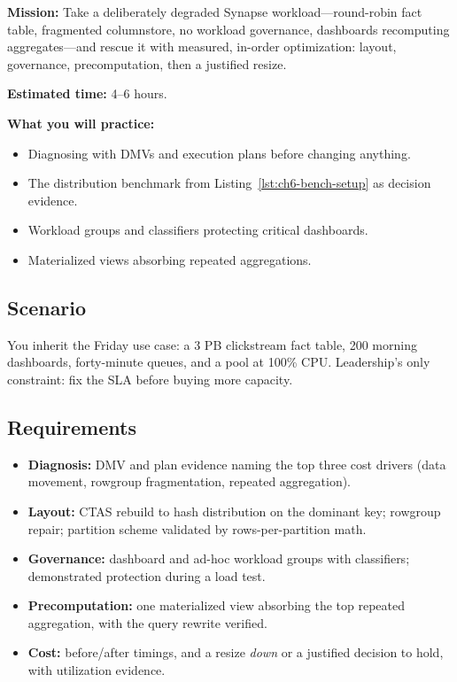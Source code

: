 \begin{capstonebox}
\textbf{Mission:} Take a deliberately degraded Synapse workload---round-robin fact table, fragmented columnstore, no workload governance, dashboards recomputing aggregates---and rescue it with measured, in-order optimization: layout, governance, precomputation, then a justified resize.

\textbf{Estimated time:} 4--6 hours.

\textbf{What you will practice:}
\begin{itemize}
    \item Diagnosing with DMVs and execution plans before changing anything.
    \item The distribution benchmark from Listing~\ref{lst:ch6-bench-setup} as decision evidence.
    \item Workload groups and classifiers protecting critical dashboards.
    \item Materialized views absorbing repeated aggregations.
\end{itemize}
\end{capstonebox}

\subsection*{Scenario}
You inherit the Friday use case: a 3 PB clickstream fact table, 200 morning dashboards, forty-minute queues, and a pool at 100\% CPU. Leadership's only constraint: fix the SLA before buying more capacity.

\subsection*{Requirements}
\begin{itemize}
    \item \textbf{Diagnosis:} DMV and plan evidence naming the top three cost drivers (data movement, rowgroup fragmentation, repeated aggregation).
    \item \textbf{Layout:} CTAS rebuild to hash distribution on the dominant key; rowgroup repair; partition scheme validated by rows-per-partition math.
    \item \textbf{Governance:} dashboard and ad-hoc workload groups with classifiers; demonstrated protection during a load test.
    \item \textbf{Precomputation:} one materialized view absorbing the top repeated aggregation, with the query rewrite verified.
    \item \textbf{Cost:} before/after timings, and a resize \emph{down} or a justified decision to hold, with utilization evidence.
\end{itemize}

